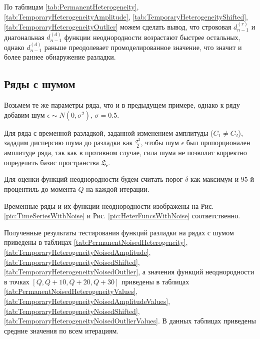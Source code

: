 \documentclass[specialist, substylefile = spbu.rtx,
			   subf, href, 12pt]{disser}
\begin{document}
По таблицам \ref{tab:PermanentHeterogeneity}, \ref{tab:TemporaryHeterogeneityAmplitude}, \ref{tab:TemporaryHeterogeneityShifted}, \ref{tab:TemporaryHeterogeneityOutlier} можем сделать вывод, что строковая $d_{n-1}^{(r)}$ и диагональная $d_{n-1}^{(d)}$ функции неоднородности возрастают быстрее остальных, однако $d_{n-1}^{(d)}$ раньше преодолевает промоделированное значение, что значит и более раннее обнаружение разладки.


\newpage
\subsection{Ряды с шумом}
Возьмем те же параметры ряда, что и в предыдущем примере, однако к ряду добавим шум $\epsilon \sim N(0, \sigma^2)$, $\sigma = 0.5$. 

Для ряда с временной разладкой, заданной изменением амплитуды ($C_1 \neq C_2$), зададим дисперсию шума до разладки как $\frac{\sigma^2}{2}$, чтобы шум $\epsilon$ был пропорционален амплитуде ряда, так как в противном случае, сила шума не позволит корректно определить базис пространства $ \mathfrak{L_r} $. 

Для оценки функций неоднородности будем считать порог $ \delta $ как максимум и $ 95 $-й процентиль до момента $ Q $ на каждой итерации.

Временные ряды и их функции неоднородности изображены на Рис. \ref{pic:TimeSeriesWithNoise} и Рис. \ref{pic:HeterFuncsWithNoise} соответственно.

Полученные результаты тестирования функций разладки на рядах с шумом приведены в таблицах \ref{tab:PermanentNoisedHeterogeneity}, \ref{tab:TemporaryHeterogeneityNoisedAmplitude}, \ref{tab:TemporaryHeterogeneityNoisedShifted}, \ref{tab:TemporaryHeterogeneityNoisedOutlier}, а значения функций неоднородности в точках $[Q, Q+10, Q+20, Q+30] $ приведены в таблицах \ref{tab:PermanentNoisedHeterogeneityValues}, \ref{tab:TemporaryHeterogeneityNoisedAmplitudeValues}, \ref{tab:TemporaryHeterogeneityNoisedShifted}, \ref{tab:TemporaryHeterogeneityNoisedOutlierValues}. В данных таблицах приведены средние значения по всем итерациям.
\end{document}
